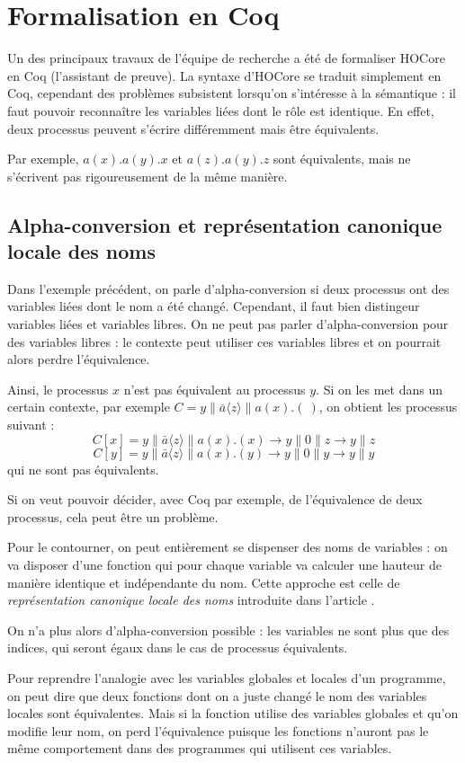 \documentclass[11pt]{article}
\begin{document}
\section{Formalisation en Coq}
Un des principaux travaux de l'équipe de recherche a été de formaliser HOCore en Coq (l'assistant de preuve).
La syntaxe d'HOCore se traduit simplement en Coq, cependant des problèmes subsistent lorsqu'on s'intéresse à la sémantique : il faut pouvoir reconnaître les variables liées dont le rôle est identique. En effet, deux processus peuvent s'écrire différemment mais être équivalents.

Par exemple, $a(x).a(y).x$ et $a(z).a(y).z$ sont équivalents, mais ne s'écrivent pas rigoureusement de la même manière.

\subsection{Alpha-conversion et représentation canonique locale des noms}
Dans l'exemple précédent, on parle d'alpha-conversion si deux processus ont des variables liées dont le nom a été changé. Cependant, il faut bien distingeur variables liées et variables libres. On ne peut pas parler d'alpha-conversion pour des variables libres : le contexte peut utiliser ces variables libres et on pourrait alors perdre l'équivalence.

Ainsi, le processus $x$ n'est pas équivalent au processus $y$. Si on les met dans un certain contexte, par exemple $C = y\|\bar{a}\langle z\rangle\|a(x).(\ )$, on obtient les processus suivant : 
$$C[x] = y\|\bar{a}\langle z\rangle\|a(x).(x) \rightarrow y\|0\|z \rightarrow y\|z$$
$$C[y] = y\|\bar{a}\langle z\rangle\|a(x).(y) \rightarrow y\|0\|y \rightarrow y\|y$$
qui ne sont pas équivalents.

Si on veut pouvoir décider, avec Coq par exemple, de l'équivalence de deux processus, cela peut être un problème.

Pour le contourner, on peut entièrement se dispenser des noms de variables : on va disposer d'une fonction qui pour chaque variable va calculer une hauteur de manière identique et indépendante du nom. Cette approche est celle de \textit{représentation canonique locale des noms} introduite dans l'article \cite{canonical} .

On n'a plus alors d'alpha-conversion possible : les variables ne sont plus que des indices, qui seront égaux dans le cas de processus équivalents.

Pour reprendre l'analogie avec les variables globales et locales d'un programme, on peut dire que deux fonctions dont on a juste changé le nom des variables locales sont équivalentes. Mais si la fonction utilise des variables globales et qu'on modifie leur nom, on perd l'équivalence puisque les fonctions n'auront pas le même comportement dans des programmes qui utilisent ces variables.
\end{document}
